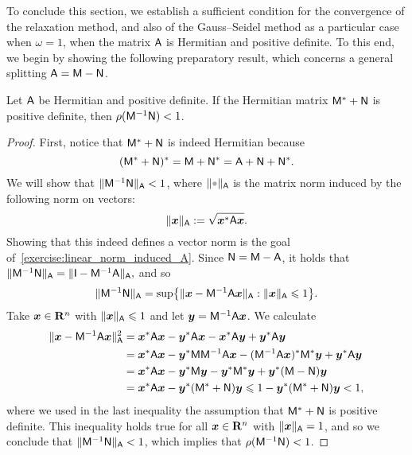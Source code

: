 To conclude this section,
we establish a sufficient condition for the convergence of the relaxation method,
and also of the Gauss--Seidel method as a particular case when $\omega = 1$,
when the matrix $\mathsf A$ is Hermitian and positive definite.
To this end, we begin by showing the following preparatory result,
which concerns a general splitting $\mathsf A = \mathsf M - \mathsf N$.
\begin{proposition}
    \label{proposition:criterion_convergence}
    Let $\mathsf A$ be Hermitian and positive definite.
    If the Hermitian matrix $\mathsf M^* + \mathsf N$ is positive definite,
    then $\rho(\mathsf M^{-1} \mathsf N) < 1$.
\end{proposition}
\begin{proof}
    First, notice that $\mathsf M^* + \mathsf N$ is indeed Hermitian because
    \[
        (\mathsf M^* + \mathsf N)^* = \mathsf M + \mathsf N^* = \mathsf A + \mathsf N + \mathsf N^*.
    \]
    We will show that $\lVert\mathsf M^{-1} \mathsf N\rVert_{\mathsf A} < 1$,
    where $\norm{\placeholder}_{\mat A}$ is the matrix norm induced by the following norm on vectors:
    \[
        \lVert\mathbf{\boldsymbol{x}}\rVert_{\mathsf A} := \sqrt{\mathbf{\boldsymbol{x}}^* \mathsf A \mathbf{\boldsymbol{x}}}.
    \]
    Showing that this indeed defines a vector norm is the goal of~\cref{exercise:linear_norm_induced_A}.
    Since $\mathsf N = \mathsf M - \mathsf A$, it holds that
    \(
        \lVert\mathsf M^{-1} \mathsf N\rVert_{\mathsf A}
        = \lVert\mathsf I - \mathsf M^{-1} \mathsf A\rVert_{\mathsf A},
    \)
    and so
    \[
        \lVert\mathsf M^{-1} \mathsf N\rVert_{\mathsf A}
        = \sup \bigl\{ \lVert\mathbf{\boldsymbol{x}} - \mathsf M^{-1} \mathsf A \mathbf{\boldsymbol{x}}\rVert_{\mathsf A}: \lVert\mathbf{\boldsymbol{x}}\rVert_{\mathsf A} \leqslant 1 \bigr\}.
    \]
    Take $\mathbf{\boldsymbol{x}} \in \mathbf R^n$ with $\lVert\mathbf{\boldsymbol{x}}\rVert_{\mathsf A} \leqslant 1$
    and let $\mathbf{\boldsymbol{y}} = \mathsf M^{-1} \mathsf A \mathbf{\boldsymbol{x}}$.
    We calculate
    \begin{align*}
        \lVert\mathbf{\boldsymbol{x}} - \mathsf M^{-1} \mathsf A \mathbf{\boldsymbol{x}}\rVert_{\mathsf A}^2
        &= \mathbf{\boldsymbol{x}}^* \mathsf A \mathbf{\boldsymbol{x}} - \mathbf{\boldsymbol{y}}^* \mathsf A \mathbf{\boldsymbol{x}} - \mathbf{\boldsymbol{x}}^* \mathsf A \mathbf{\boldsymbol{y}} + \mathbf{\boldsymbol{y}}^* \mathsf A \mathbf{\boldsymbol{y}} \\
        &= \mathbf{\boldsymbol{x}}^* \mathsf A \mathbf{\boldsymbol{x}} - \mathbf{\boldsymbol{y}}^* \mathsf M \mathsf M^{-1} \mathsf A \mathbf{\boldsymbol{x}} - (\mathsf M^{-1} \mathsf A \mathbf{\boldsymbol{x}})^* \mathsf M^* \mathbf{\boldsymbol{y}} + \mathbf{\boldsymbol{y}}^* \mathsf A \mathbf{\boldsymbol{y}} \\
        &= \mathbf{\boldsymbol{x}}^* \mathsf A \mathbf{\boldsymbol{x}} - \mathbf{\boldsymbol{y}}^* \mathsf M \mathbf{\boldsymbol{y}} - \mathbf{\boldsymbol{y}}^* \mathsf M^* \mathbf{\boldsymbol{y}} + \mathbf{\boldsymbol{y}}^* (\mathsf M - \mathsf N) \mathbf{\boldsymbol{y}} \\
        &= \mathbf{\boldsymbol{x}}^* \mathsf A \mathbf{\boldsymbol{x}} - \mathbf{\boldsymbol{y}}^* (\mathsf M^* + \mathsf N) \mathbf{\boldsymbol{y}} \leqslant 1 - \mathbf{\boldsymbol{y}}^* (\mathsf M^* + \mathsf N) \mathbf{\boldsymbol{y}} < 1,
    \end{align*}
    where we used in the last inequality the assumption that $\mathsf M^* + \mathsf N$ is positive definite.
    This inequality holds true for all $\mathbf{\boldsymbol{x}} \in \mathbf R^n$ with $\lVert\mathbf{\boldsymbol{x}}\rVert_{\mathsf A} = 1$,
    and so we conclude that \( \lVert\mathsf M^{-1} \mathsf N\rVert_{\mathsf  A} < 1\),
    which implies that $\rho(\mathsf M^{-1} \mathsf N) < 1$.
\end{proof}

